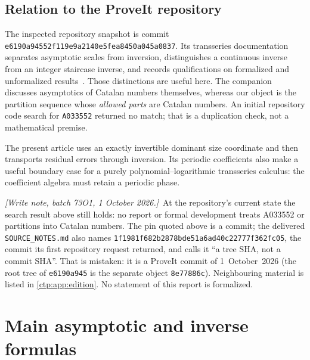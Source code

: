 \documentclass[11pt,a4paper]{article}
\numberwithin{equation}{section}
\theoremstyle{definition}
\theoremstyle{remark}
\newcommand{\writenote}[1]{\par\smallskip\noindent
 \textit{[Write note, batch 73O1, 1 October 2026.]}\ #1\par\smallskip}
\begin{document}
\subsection{Relation to the ProveIt repository}
The inspected repository snapshot is commit
\texttt{e6190a94552f119e9a2140e5fea8450a045a0837}. Its transseries documentation
separates asymptotic scales from inversion, distinguishes a continuous inverse
from an integer staircase inverse, and records qualifications on formalized
and unformalized results~\cite{proveit}. Those distinctions are useful here.
The companion discusses asymptotics of Catalan numbers themselves, whereas
our object is the partition sequence whose \emph{allowed parts} are Catalan
numbers. An initial repository code search for \texttt{A033552} returned no match;
that is a duplication check, not a mathematical premise.

The present article uses an exactly invertible dominant size coordinate and
then transports residual errors through inversion. Its periodic coefficients
also make a useful boundary case for a purely polynomial--logarithmic
transseries calculus: the coefficient algebra must retain a periodic phase.

\writenote{At the repository's current state the search result above
still holds: no report or formal development treats A033552 or
partitions into Catalan numbers. The pin quoted above is a commit; the
delivered \texttt{SOURCE\_NOTES.md} also names
\texttt{1f1981f682b2878bde51a6ad40c22777f362fc05}, the commit its first
repository request returned, and calls it ``a tree SHA, not a commit
SHA''. That is mistaken: it is a ProveIt commit of 1~October~2026 (the
root tree of \texttt{e6190a945} is the separate object
\texttt{8e77886c}). Neighbouring material is listed in
\cref{ctp:app:edition}. No statement of this report is formalized.}

\section{Main asymptotic and inverse formulas}
\label{ctp:sec:main}
\end{document}
